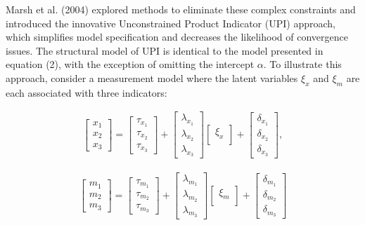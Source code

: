 \documentclass[
  man]{apa6}
\begin{document}
Marsh et al. (2004) explored methods to eliminate these complex constraints and introduced the innovative Unconstrained Product Indicator (UPI) approach, which simplifies model specification and decreases the likelihood of convergence issues. The structural model of UPI is identical to the model presented in equation (2), with the exception of omitting the intercept \(\alpha\). To illustrate this approach, consider a measurement model where the latent variables \(\xi_{x}\) and \(\xi_{m}\) are each associated with three indicators:

\begin{align}
    \begin{bmatrix}
        x_{1} \\
        x_{2} \\ 
        x_{3}
    \end{bmatrix} =
    \begin{bmatrix}
        \tau_{x_{1}} \\
        \tau_{x_{2}} \\ 
        \tau_{x_{3}}
    \end{bmatrix} +
    \begin{bmatrix}
        \lambda_{x_{1}} \\
        \lambda_{x_{2}} \\ 
        \lambda_{x_{3}}
    \end{bmatrix}
    \begin{bmatrix}
        \xi_{x} \\
    \end{bmatrix} +
    \begin{bmatrix}
        \delta_{x_{1}} \\
        \delta_{x_{2}} \\ 
        \delta_{x_{3}}
    \end{bmatrix},
\end{align}

\begin{align}
    \begin{bmatrix}
        m_{1} \\
        m_{2} \\ 
        m_{3}
    \end{bmatrix} =
    \begin{bmatrix}
        \tau_{m_{1}} \\
        \tau_{m_{2}} \\ 
        \tau_{m_{3}}
    \end{bmatrix} +
    \begin{bmatrix}
        \lambda_{m_{1}} \\
        \lambda_{m_{2}} \\ 
        \lambda_{m_{3}}
    \end{bmatrix}
    \begin{bmatrix}
        \xi_{m} \\
    \end{bmatrix} +
    \begin{bmatrix}
        \delta_{m_{1}} \\
        \delta_{m_{2}} \\ 
        \delta_{m_{3}}
    \end{bmatrix}
\end{align}
\end{document}
